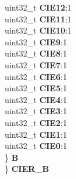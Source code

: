\begin{DoxyCompactItemize}
\begin{tabbing}
\>\>uint32\_t {\bfseries CIE12}:1\\
\>\>uint32\_t {\bfseries CIE11}:1\\
\>\>uint32\_t {\bfseries CIE10}:1\\
\>\>uint32\_t {\bfseries CIE9}:1\\
\>\>uint32\_t {\bfseries CIE8}:1\\
\>\>uint32\_t {\bfseries CIE7}:1\\
\>\>uint32\_t {\bfseries CIE6}:1\\
\>\>uint32\_t {\bfseries CIE5}:1\\
\>\>uint32\_t {\bfseries CIE4}:1\\
\>\>uint32\_t {\bfseries CIE3}:1\\
\>\>uint32\_t {\bfseries CIE2}:1\\
\>\>uint32\_t {\bfseries CIE1}:1\\
\>\>uint32\_t {\bfseries CIE0}:1\\
\>\} {\bfseries B}\\
\} {\bfseries CIER\_B}\\


\end{tabbing}
\end{DoxyCompactItemize}
